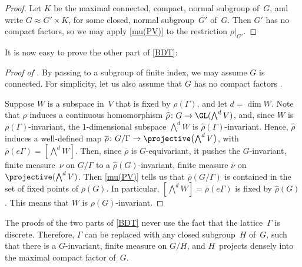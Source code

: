 \begin{proof}
 Let $K$ be the maximal connected, compact, normal
subgroup of~$G$, and write $G \approx G' \times K$, for
some closed, normal subgroup~$G'$ of~$G$. Then $G'$ has no
compact factors, so we may apply \cref{mu(PV)} to the
restriction $\rho|_{G'}$.
 \end{proof}

It is now easy to prove the other part of \cref{BDT}:

\begin{proof}[Proof of ]
By passing to a subgroup of finite index, we may assume $G$ is connected. For simplicity, let us also assume that $G$ has no compact factors .

Suppose $W$ is a subspace in~$V$ that is fixed by $\rho(\Gamma)$, and let $d = \dim W$. Note that $\rho$ induces a continuous homomorphism $\widehat\rho \colon G \to \GL(\bigwedge^d V)$, and, since $W$ is $\rho(\Gamma)$-invariant, the $1$-dimensional subspace $\bigwedge^d W$ is $\widehat\rho(\Gamma)$-invariant. Hence, $\widehat\rho$ induces a well-defined map $\overline\rho \colon G/\Gamma \to \projective \bigl( \bigwedge^d V \bigr)$, with $\overline\rho(e\Gamma) = [\bigwedge^d W]$. Then, since $\overline\rho$ is $G$-equivariant, it pushes the $G$-invariant, finite measure~$\nu$ on $G/\Gamma$ to a $\widehat\rho(G)$-invariant, finite measure $\overline\nu$ on $\projective(\bigwedge^d V)$. Then \cref{mu(PV)} tells us that $\overline\rho(G/\Gamma)$ is contained in the set of fixed points of $\overline\rho(G)$. In  particular, $[\bigwedge^d W] = \overline\rho(e\Gamma)$ is fixed by $\widehat\rho(G)$. This means that $W$ is $\rho(G)$-invariant.
 \end{proof}

\begin{rem} \label{BDTnotDiscrete}
The proofs of the two parts of \cref{BDT} never use the fact that the lattice~$\Gamma$ is discrete. Therefore, $\Gamma$ can be replaced with any closed subgroup~$H$ of~$G$, such that there is a $G$-invariant, finite measure on $G/H$, and $H$~projects densely into the maximal compact factor of~$G$.
\end{rem}

